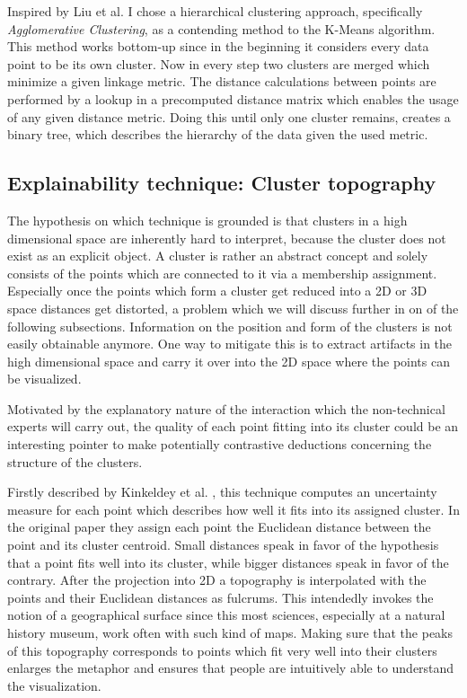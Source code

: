 Inspired by Liu et al. \cite{Liu:2018:INE:3219819.3220001} I chose a hierarchical clustering approach, specifically \textit{Agglomerative Clustering}, as a contending method to the K-Means algorithm. This method works bottom-up since in the beginning it considers every data point to be its own cluster. Now in every step two clusters are merged which minimize a given linkage metric. The distance calculations between points are performed by a lookup in a precomputed distance matrix which enables the usage of any given distance metric. Doing this until only one cluster remains, creates a binary tree, which describes the hierarchy of the data given the used metric. 



\subsection{Explainability technique: Cluster topography }

The hypothesis on which technique is grounded is that clusters in a high dimensional space are inherently hard to interpret, because the cluster does not exist as an explicit object. A cluster is rather an abstract concept and solely consists of the points which are connected to it via a membership assignment. Especially once the points which form a cluster get reduced into a 2D or 3D space distances get distorted, a problem which we will discuss further in on of the following subsections. Information on the position and form of the clusters is not easily obtainable anymore. One way to mitigate this is to extract artifacts in the high dimensional space and carry it over into the 2D space where the points can be visualized.

Motivated by the explanatory nature of the interaction which the non-technical experts will carry out, the quality of each point fitting into its cluster could be an interesting pointer to make potentially contrastive deductions concerning the structure of the clusters.

Firstly described by Kinkeldey et al. \cite{christophkinkeldeySupportingInterpretabilityClustering2019}, this technique computes an uncertainty measure for each point which describes how well it fits into its assigned cluster. In the original paper they assign each point the Euclidean distance between the point and its cluster centroid. Small distances speak in favor of the hypothesis that a point fits well into its cluster, while bigger distances speak in favor of the contrary. After the projection into 2D a topography is interpolated with the points and their Euclidean distances as fulcrums. This intendedly invokes the notion of a geographical surface since this most sciences, especially at a natural history museum, work often with such kind of maps. Making sure that the peaks of this topography corresponds to points which fit very well into their clusters enlarges the metaphor and ensures that people are intuitively able to understand the visualization. 

